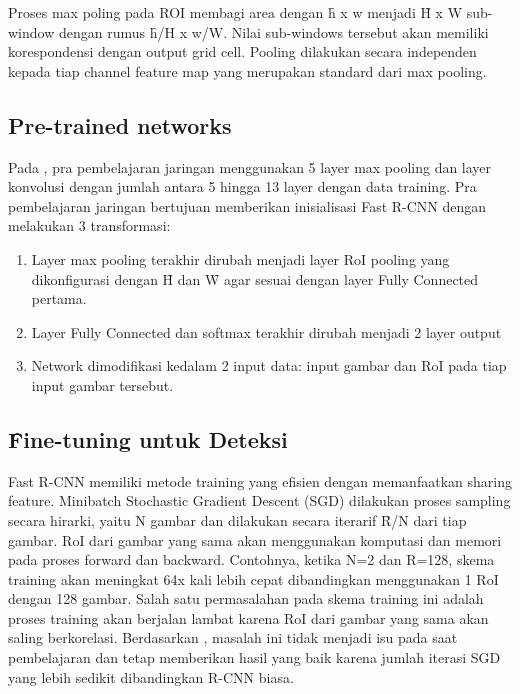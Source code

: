 Proses max poling pada ROI membagi area dengan \f{h x w} menjadi \f{H x W} sub-window dengan rumus \f{h/H x w/W}. Nilai sub-windows tersebut akan memiliki korespondensi dengan output grid cell. Pooling dilakukan secara independen kepada tiap channel feature map yang merupakan standard dari max pooling.

\subsection{Pre-trained networks}
Pada \cite{fast_rcnn}, pra pembelajaran jaringan menggunakan 5 layer max pooling dan layer konvolusi dengan jumlah antara 5 hingga 13 layer dengan data training. Pra pembelajaran jaringan bertujuan memberikan inisialisasi Fast R-CNN dengan melakukan 3 transformasi:
\begin{enumerate}
	\item Layer max pooling terakhir dirubah menjadi layer RoI pooling yang dikonfigurasi dengan \f{H} dan \f{W} agar sesuai dengan layer Fully Connected pertama.
	\item Layer Fully Connected dan softmax terakhir dirubah menjadi 2 layer output
	\item Network dimodifikasi kedalam 2 input data: input gambar dan RoI pada tiap input gambar tersebut.
\end{enumerate}

\subsection{\f{Fine-tuning} untuk Deteksi}
Fast R-CNN memiliki metode training yang efisien dengan memanfaatkan sharing feature. Minibatch Stochastic Gradient Descent (SGD) dilakukan proses sampling secara hirarki, yaitu N gambar dan dilakukan secara iterarif \f{R/N} dari tiap gambar. RoI dari gambar yang sama akan menggunakan komputasi dan memori pada proses forward dan backward. Contohnya, ketika N=2 dan R=128, skema training akan meningkat 64x kali lebih cepat dibandingkan menggunakan 1 RoI dengan 128 gambar. Salah satu permasalahan pada skema training ini adalah proses training akan berjalan lambat karena RoI dari gambar yang sama akan saling berkorelasi. Berdasarkan \cite{fast_rcnn}, masalah ini tidak menjadi isu pada saat pembelajaran dan tetap memberikan hasil yang baik karena jumlah iterasi SGD yang lebih sedikit dibandingkan R-CNN biasa.

